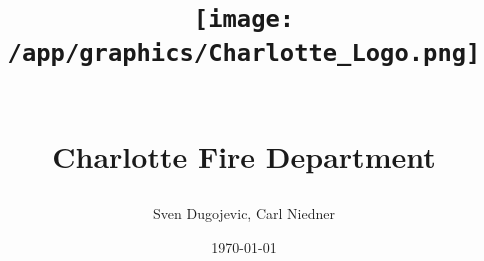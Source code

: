 \begin{titlepage}
    \centering
    \title{
        \begin{minipage}{\textwidth}
            \centering
            \texttt{[image: /app/graphics/Charlotte\_Logo.png]}
        \end{minipage} \\
        \vspace{1cm}
        Charlotte Fire Department
    }
    \author{Sven Dugojevic, Carl Niedner}
    \date{\today}
    \vspace{3cm}
    \maketitle
    \end{titlepage}
    